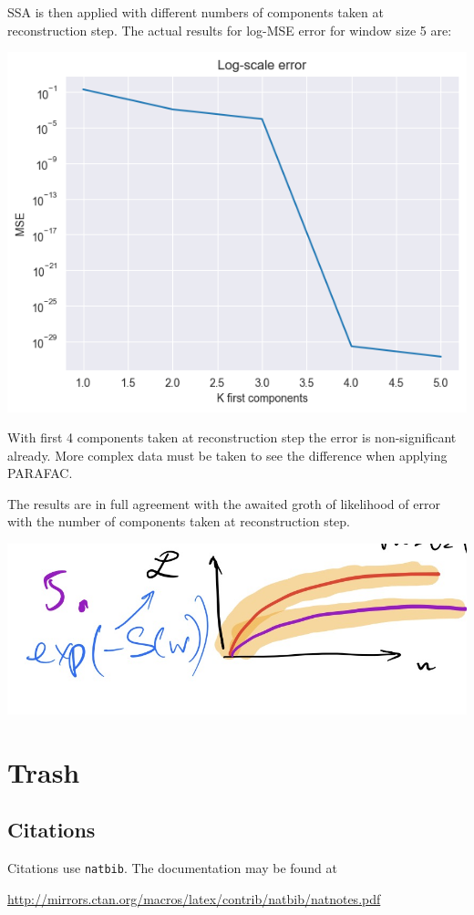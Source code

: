 \documentclass{article}
\begin{document}
SSA is then applied with different numbers of components taken at reconstruction step. The actual results for log-MSE error for window size 5 are:

\includegraphics[scale=0.7]{./images/fig2.png}

With first 4 components taken at reconstruction step the error is non-significant already. More complex data must be taken to see the difference when applying PARAFAC.

The results are in full agreement with the awaited groth of likelihood of error with the number of components taken at reconstruction step.

\includegraphics[scale=0.3]{./images/prelim.png}

\section{Trash}

\subsection{Citations}
Citations use \verb+natbib+. The documentation may be found at
\begin{center}
	\url{http://mirrors.ctan.org/macros/latex/contrib/natbib/natnotes.pdf}
\end{center}
\end{document}
